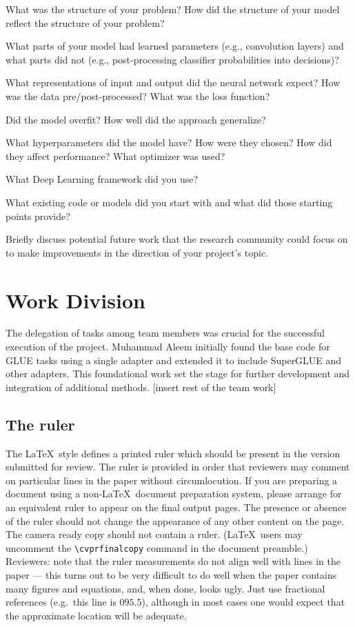 \documentclass[10pt,twocolumn,letterpaper]{article}
\begin{document}
What was the structure of your problem? How did the structure of your model reflect the structure of your problem? 

What parts of your model had learned parameters (e.g., convolution layers) and what parts did not (e.g., post-processing classifier probabilities into decisions)? 

What representations of input and output did the neural network expect? How was the data pre/post-processed?
What was the loss function? 

Did the model overfit? How well did the approach generalize? 

What hyperparameters did the model have? How were they chosen? How did they affect performance? What optimizer was used? 

What Deep Learning framework did you use? 

What existing code or models did you start with and what did those starting points provide? 

Briefly discuss potential future work that the research community could focus on to make improvements in the direction of your project's topic.



\section{Work Division}

The delegation of tasks among team members was crucial for the successful execution of the project. Muhammad Aleem initially found the base code for GLUE tasks using a single adapter and extended it to include SuperGLUE and other adapters. This foundational work set the stage for further development and integration of additional methods. [insert rest of the team work]
\subsection{The ruler}
The \LaTeX\ style defines a printed ruler which should be present in the
version submitted for review.  The ruler is provided in order that
reviewers may comment on particular lines in the paper without
circumlocution.  If you are preparing a document using a non-\LaTeX\
document preparation system, please arrange for an equivalent ruler to
appear on the final output pages.  The presence or absence of the ruler
should not change the appearance of any other content on the page.  The
camera ready copy should not contain a ruler. (\LaTeX\ users may uncomment
the \verb'\cvprfinalcopy' command in the document preamble.)  Reviewers:
note that the ruler measurements do not align well with lines in the paper
--- this turns out to be very difficult to do well when the paper contains
many figures and equations, and, when done, looks ugly.  Just use fractional
references (e.g.\ this line is $095.5$), although in most cases one would
expect that the approximate location will be adequate.
\end{document}
